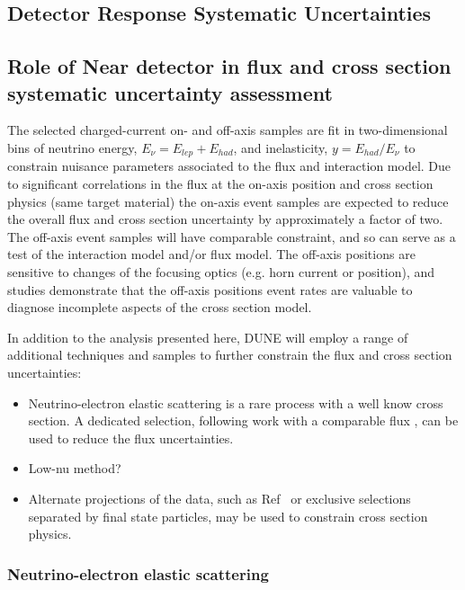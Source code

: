 \subsection{Detector Response Systematic Uncertainties}


\subsection{Role of Near detector in flux and cross section systematic uncertainty assessment}

 The selected charged-current on- and off-axis samples are fit in two-dimensional bins of neutrino energy, $E_{\nu} = E_{lep} + E_{had}$, and inelasticity, $y = E_{had}/E_{\nu}$ to constrain nuisance parameters associated to the flux and interaction model. Due to significant correlations in the flux at the on-axis position and  cross section physics (same target material) the on-axis event samples are expected to reduce the overall flux and cross section uncertainty by approximately a factor of two. The off-axis event samples will have comparable constraint, and so can serve as a test of the interaction model and/or flux model. The off-axis positions are sensitive to changes of the focusing optics (e.g. horn current or position), and studies demonstrate that the off-axis positions event rates are valuable to diagnose incomplete aspects of the cross section model.

In addition to the analysis presented here, DUNE will employ a range of additional techniques and samples to further constrain the flux and cross section uncertainties: \begin{itemize}
\item Neutrino-electron elastic scattering is a rare process with a well know cross section. A dedicated selection, following work with a comparable flux%
, can be used to reduce the flux uncertainties.
\item Low-nu method?
\item Alternate projections of the data, such as Ref~%
or exclusive selections separated by final state particles, may be
 used to constrain cross section physics.
\end{itemize}

\subsubsection{Neutrino-electron elastic scattering}
\label{sec:nu+e}

